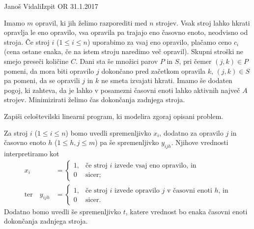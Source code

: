 \begin{naloga}{Janoš Vidali}{Izpit OR 31.1.2017}
\begin{vprasanje}
Imamo $m$ opravil, ki jih želimo razporediti med $n$ strojev.
Vsak stroj lahko hkrati opravlja le eno opravilo,
vsa opravila pa trajajo eno časovno enoto, neodvisno od stroja.
Če stroj $i$ ($1 \le i \le n$) uporabimo za vsaj eno opravilo,
plačamo ceno $c_i$
(cena ostane enaka, če na istem stroju naredimo več opravil).
Skupni stroški ne smejo preseči količine $C$.
Dani sta še množici parov $P$ in $S$,
pri čemer $(j, k) \in P$ pomeni,
da mora biti opravilo $j$ dokončano pred začetkom opravila $k$,
$(j, k) \in S$ pa pomeni, da se opravili $j$ in $k$ ne smeta izvajati hkrati.
Imamo še dodaten pogoj, ki zahteva,
da je lahko v posamezni časovni enoti lahko aktivnih največ $A$ strojev.
Minimizirati želimo čas dokončanja zadnjega stroja.

Zapiši celoštevilski linearni program, ki modelira zgoraj opisani problem.
\end{vprasanje}

\begin{odgovor}
Za stroj $i$ ($1 \le i \le n$) bomo uvedli spremenljivko $x_i$,
dodatno za opravilo $j$ in časovno enoto $h$ ($1 \le h, j \le m$)
pa še spremenljivko $y_{ijh}$.
Njihove vrednosti interpretiramo kot
\begin{align*}
x_i &= \begin{cases}
1, & \text{če stroj $i$ izvede vsaj eno opravilo, in} \\
0  & \text{sicer;}
\end{cases} \\
\text{ter} \quad
y_{ijh} &= \begin{cases}
1, & \text{če stroj $i$ izvede opravilo $j$ v časovni enoti $h$, in} \\
0  & \text{sicer.}
\end{cases}
\end{align*}
Dodatno bomo uvedli še spremenljivko $t$,
katere vrednost bo enaka časovni enoti dokončanja zadnjega stroja.


\end{odgovor}
\end{naloga}
